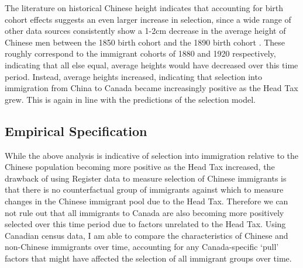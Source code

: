The literature on historical Chinese height indicates that accounting for birth cohort effects suggests an even larger increase in selection, since a wide range of other data sources consistently show a 1-2cm decrease in the average height of Chinese men between the 1850 birth cohort and the 1890 birth cohort \citep{batenetal2010}. These roughly correspond to the immigrant cohorts of 1880 and 1920 respectively, indicating that all else equal, average heights would have decreased over this time period. Instead, average heights increased, indicating that selection into immigration from China to Canada became increasingly positive as the Head Tax grew. This is again in line with the predictions of the \citet{chiquiarhanson2005} selection model. 






\subsection{Empirical Specification}
While the above analysis is indicative of selection into immigration relative to the Chinese population becoming more positive as the Head Tax increased, the drawback of using Register data to measure selection of Chinese immigrants is that there is no counterfactual group of immigrants against which to measure changes in the Chinese immigrant pool due to the Head Tax. Therefore we can not rule out that all immigrants to Canada are also becoming more positively selected over this time period due to factors unrelated to the Head Tax. Using Canadian census data, I am able to compare the characteristics of Chinese and non-Chinese immigrants over time, accounting for any Canada-specific `pull' factors that might have affected the selection of all immigrant groups over time. 

